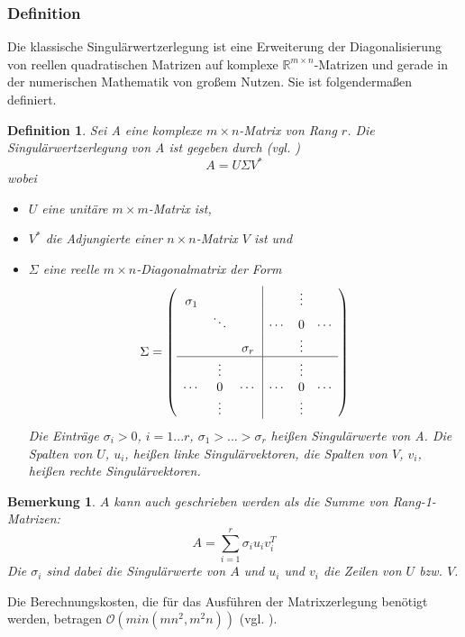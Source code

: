 \documentclass[12pt,a4paper,twoside]{article}
\newtheorem{Definition}[Satz]{Definition}
\newtheorem{Bemerkung}{Bemerkung}
\begin{document}
		\subsubsection{Definition}
		Die klassische Singulärwertzerlegung ist eine Erweiterung der Diagonalisierung von reellen quadratischen 
		Matrizen auf komplexe $\mathds{R}^{m\times n}$-Matrizen und gerade in der numerischen Mathematik von großem 
		Nutzen. Sie ist folgendermaßen definiert.		
		\begin{Definition}
		Sei A eine komplexe $m\times n$-Matrix von Rang $r$. Die Singulärwertzerlegung von A ist gegeben durch (vgl. 			\cite{deuflhard2008})
		\begin{equation*}
			\label{eq:SVD}
			A=U\Sigma V^* 
		\end{equation*}
		wobei
		\begin{itemize}
			\item $U$ eine unitäre $m\times m$-Matrix ist,
			\item $V^*$ die Adjungierte einer $n\times n$-Matrix $V$ ist und
			\item $\Sigma$ eine reelle $m\times n$-Diagonalmatrix der Form \[
	 		\Sigma = \left(\begin{array}{ccc|ccc}
					\sigma_1 &          &         &       & \vdots &       \\
         			& \ddots   &         & \cdots & 0      & \cdots \\
         			&      &\sigma_r &        & \vdots &        \\
					\hline
        			 &  \vdots  &        &       & \vdots &        \\
					\cdots   & 0       & \cdots   & \cdots & 0      & \cdots \\
        			 &  \vdots  &         &        & \vdots &        \\
					\end{array}\right)
			\]
			Die Einträge $\sigma_i>0$, $i=1...r$, $\sigma_1>...>\sigma_r$ heißen Singulärwerte von A. Die Spalten von $U$, $u_i$, heißen linke Singulärvektoren, die Spalten von $V$, $v_i$, heißen rechte Singulärvektoren.
		\end{itemize}
		\end{Definition}
		\begin{Bemerkung}
			$A$ kann auch geschrieben werden als die Summe von Rang-1-Matrizen:
			\begin{equation*}
				\label{eq:SVDsum}
				A=\sum_{i=1}^r\sigma_i u_i v_i^T
			\end{equation*}
			Die $\sigma_i$ sind dabei die Singulärwerte von $A$ und $u_i$ und $v_i$ die Zeilen von $U$ bzw. $V$.
		\end{Bemerkung}
		Die Berechnungskosten, die für das Ausführen der Matrixzerlegung benötigt werden, betragen $\mathcal{O}(min(mn^2,m^2n))$ (vgl. \cite{mahoney2008}).
\end{document}
